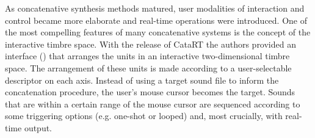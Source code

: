 As concatenative synthesis methods matured, user modalities of interaction and control became more elaborate and real-time operations were introduced. One of the most compelling features of many concatenative systems is the concept of the interactive timbre space. With the release of CataRT \citep{Schwarz2006} the authors provided an interface () that arranges the units in an interactive two-dimensional timbre space. The arrangement of these units is made according to a user-selectable descriptor on each axis. Instead of using a target sound file to inform the concatenation procedure, the user’s mouse cursor becomes the target. Sounds that are within a certain range of the mouse cursor are sequenced according to some triggering options (e.g. one-shot or  looped) and, most crucially, with real-time output.

